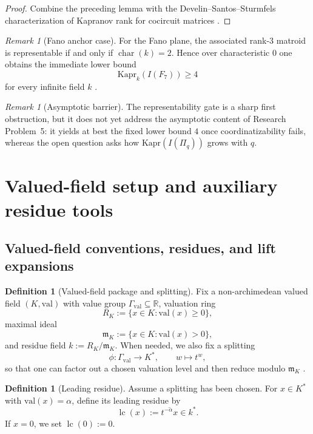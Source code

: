 \documentclass[11pt]{amsart}
\numberwithin{equation}{section}
\theoremstyle{plain}
\theoremstyle{definition}
\newtheorem{definition}[theorem]{Definition}
\theoremstyle{remark}
\newtheorem{remark}[theorem]{Remark}
\newcommand{\Kapr}{\mathrm{Kapr}}
\newcommand{\val}{\mathrm{val}}
\newcommand{\RR}{\mathbb{R}}
\begin{document}
\begin{proof}
Combine the preceding lemma with the Develin--Santos--Sturmfels characterization of Kapranov rank for cocircuit matrices
\cite{develinSantosSturmfels2005}.
\end{proof}

\begin{remark}[Fano anchor case]
For the Fano plane, the associated rank-$3$ matroid is representable if and only if $\operatorname{char}(k)=2$.
Hence over characteristic $0$ one obtains the immediate lower bound
\[
\Kapr_k(I(F_7))\ge 4
\]
for every infinite field $k$ \cite{oxley2011Fano}.
\end{remark}

\begin{remark}[Asymptotic barrier]
The representability gate is a sharp first obstruction, but it does not yet address the asymptotic content of Research Problem~5:
it yields at best the fixed lower bound $4$ once coordinatizability fails, whereas the open question asks how $\Kapr(I(\Pi_q))$
grows with $q$.
\end{remark}


\section{Valued-field setup and auxiliary residue tools}
\label{sec:framework}


\subsection{Valued-field conventions, residues, and lift expansions}
\begin{definition}[Valued-field package and splitting]
Fix a non-archimedean valued field $(K,\val)$ with value group $\Gamma_{\val}\subseteq \RR$, valuation ring
\[
R_K:=\{x\in K: \val(x)\ge 0\},
\]
maximal ideal
\[
\mathfrak m_K:=\{x\in K: \val(x)>0\},
\]
and residue field $k:=R_K/\mathfrak m_K$. When needed, we also fix a splitting
\[
\phi: \Gamma_{\val}\to K^*, \qquad w\mapsto t^w,
\]
so that one can factor out a chosen valuation level and then reduce modulo $\mathfrak m_K$ \cite{maclaganSturmfels2015}.
\end{definition}

\begin{definition}[Leading residue]
Assume a splitting has been chosen. For $x\in K^*$ with $\val(x)=\alpha$, define its leading residue by
\[
\operatorname{lc}(x):=\overline{t^{-\alpha}x}\in k^*.
\]
If $x=0$, we set $\operatorname{lc}(0):=0$.
\end{definition}
\end{document}
